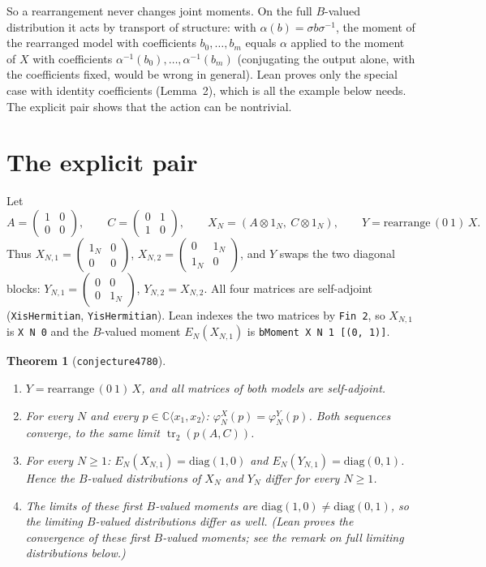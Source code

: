 \documentclass[11pt]{article}
\newtheorem{theorem}{Theorem}
\theoremstyle{definition}
\theoremstyle{remark}
\renewcommand{\_}{\oldus\allowbreak}
\newcommand{\tr}{\operatorname{tr}}
\newcommand{\C}{\mathbb{C}}
\begin{document}
So a rearrangement never changes joint moments. On the full $B$-valued distribution it acts by
transport of structure: with $\alpha(b)=\sigma b\sigma^{-1}$, the moment of the rearranged model
with coefficients $b_0,\dots,b_m$ equals $\alpha$ applied to the moment of $X$ with coefficients
$\alpha^{-1}(b_0),\dots,\alpha^{-1}(b_m)$ (conjugating the output alone, with the coefficients
fixed, would be wrong in general). Lean proves only the special case with identity coefficients
(Lemma~2), which is all the example below needs. The explicit pair shows that the action can be
nontrivial.

\section{The explicit pair}

Let
\[ A=\begin{pmatrix}1&0\\0&0\end{pmatrix},\qquad C=\begin{pmatrix}0&1\\1&0\end{pmatrix},\qquad
X_N=(A\otimes 1_N,\ C\otimes 1_N),\qquad Y=\mathrm{rearrange}\,(0\ 1)\,X . \]
Thus $X_{N,1}=\begin{pmatrix}1_N&0\\0&0\end{pmatrix}$, $X_{N,2}=\begin{pmatrix}0&1_N\\1_N&0\end{pmatrix}$,
and $Y$ swaps the two diagonal blocks:
$Y_{N,1}=\begin{pmatrix}0&0\\0&1_N\end{pmatrix}$, $Y_{N,2}=X_{N,2}$.
All four matrices are self-adjoint (\texttt{X\_isHermitian}, \texttt{Y\_isHermitian}).
Lean indexes the two matrices by \texttt{Fin 2}, so $X_{N,1}$ is \texttt{X N 0} and the
$B$-valued moment $E_N(X_{N,1})$ is \texttt{bMoment X N 1 [(0, 1)]}.

\begin{theorem}[\texttt{conjecture4780}]
\begin{enumerate}
\item $Y=\mathrm{rearrange}\,(0\ 1)\,X$, and all matrices of both models are self-adjoint.
\item For every $N$ and every $p\in\C\langle x_1,x_2\rangle$: $\varphi_N^X(p)=\varphi_N^Y(p)$.
Both sequences converge, to the same limit $\tr_2(p(A,C))$.
\item For every $N\ge1$: $E_N(X_{N,1})=\mathrm{diag}(1,0)$ and $E_N(Y_{N,1})=\mathrm{diag}(0,1)$.
Hence the $B$-valued distributions of $X_N$ and $Y_N$ differ for every $N\ge1$.
\item The limits of these first $B$-valued moments are $\mathrm{diag}(1,0)\ne\mathrm{diag}(0,1)$,
so the limiting $B$-valued distributions differ as well. (Lean proves the convergence of these
first $B$-valued moments; see the remark on full limiting distributions below.)
\end{enumerate}
\end{theorem}
\end{document}
